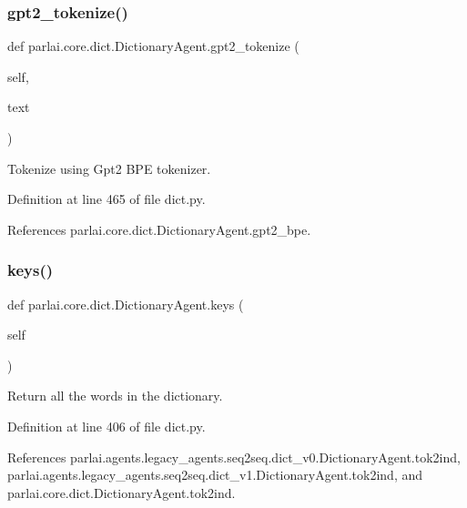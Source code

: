 \subsubsection{\texorpdfstring{gpt2\+\_\+tokenize()}{gpt2\_tokenize()}}
{\footnotesize\ttfamily def parlai.\+core.\+dict.\+Dictionary\+Agent.\+gpt2\+\_\+tokenize (\begin{DoxyParamCaption}\item[{}]{self,  }\item[{}]{text }\end{DoxyParamCaption})}

\begin{DoxyVerb}Tokenize using Gpt2 BPE tokenizer.\end{DoxyVerb}
 

Definition at line 465 of file dict.\+py.



References parlai.\+core.\+dict.\+Dictionary\+Agent.\+gpt2\+\_\+bpe.

\mbox{\label{classparlai_1_1core_1_1dict_1_1DictionaryAgent_ad5abcf174648d88f2383cba7a361dd29}} 
\subsubsection{\texorpdfstring{keys()}{keys()}}
{\footnotesize\ttfamily def parlai.\+core.\+dict.\+Dictionary\+Agent.\+keys (\begin{DoxyParamCaption}\item[{}]{self }\end{DoxyParamCaption})}

\begin{DoxyVerb}Return all the words in the dictionary.\end{DoxyVerb}
 

Definition at line 406 of file dict.\+py.



References parlai.\+agents.\+legacy\+\_\+agents.\+seq2seq.\+dict\+\_\+v0.\+Dictionary\+Agent.\+tok2ind, parlai.\+agents.\+legacy\+\_\+agents.\+seq2seq.\+dict\+\_\+v1.\+Dictionary\+Agent.\+tok2ind, and parlai.\+core.\+dict.\+Dictionary\+Agent.\+tok2ind.



